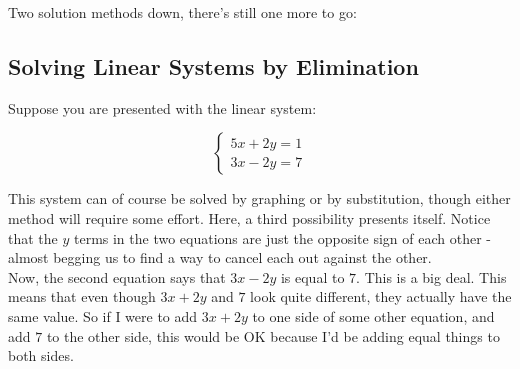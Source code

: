 
\bigskip

Two solution methods down, there’s still one more to go:

%
%

\subsection{Solving Linear Systems by Elimination}

Suppose you are presented with the linear system:

$$\begin{cases} 5x+2y=1\\3x-2y=7 \end{cases}$$

This system can of course be solved by graphing or by substitution, though either method will require some effort. Here, a third possibility presents itself. Notice that the $y$ terms in the two equations are just the opposite sign of each other - almost begging us to find a way to cancel each out against the other.\\

Now, the second equation says that $3x-2y$ is equal to $7$. This is a big deal. This means that even though $3x+2y$ and $7$ look quite different, they actually have the same value. So if I were to
add $3x+2y$ to one side of some other equation, and add $7$ to the other side, this would be OK because I’d be adding equal things to both sides.\\

